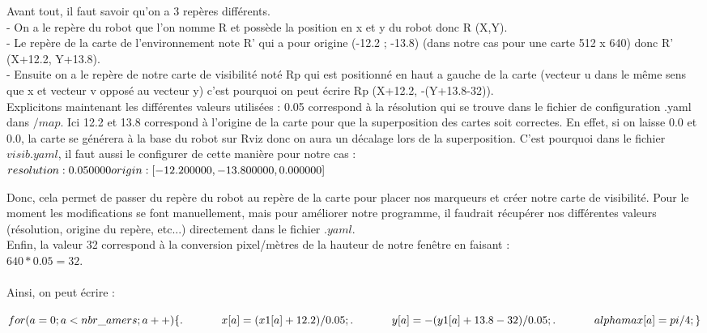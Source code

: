 \documentclass[10pt,a4paper]{article}
\begin{document}
Avant tout, il faut savoir qu'on a 3 repères différents.\\ 
- On a le repère du robot que l'on nomme R et possède la position en x et y du robot donc R (X,Y).\\
- Le repère de la carte de l'environnement note R' qui a pour origine (-12.2 ; -13.8) (dans notre cas pour une carte 512 x 640) donc R' (X+12.2, Y+13.8).\\ 
- Ensuite on a le repère de notre carte de visibilité noté Rp qui est positionné en haut a gauche de la carte (vecteur u dans le même sens que x et vecteur v opposé au vecteur y) c'est pourquoi on peut écrire Rp (X+12.2, -(Y+13.8-32)).\\

Explicitons maintenant les différentes valeurs utilisées : 0.05 correspond à la résolution qui se trouve dans le fichier de configuration .yaml dans $/map$. Ici 12.2 et 13.8 correspond à l'origine de la carte pour que la superposition des cartes soit correctes. En effet, si on laisse 0.0 et 0.0, la carte se générera à la base du robot sur Rviz donc on aura un décalage lors de la superposition. C'est pourquoi dans le fichier $visib.yaml$, il faut aussi le configurer de cette manière pour notre cas :\\
$resolution: 0.050000\\
origin: [-12.200000, -13.800000, 0.000000]\\
$

Donc, cela permet de passer du repère du robot au repère de la carte pour placer nos marqueurs et créer notre carte de visibilité. Pour le moment les modifications se font manuellement, mais pour améliorer notre programme, il faudrait récupérer nos différentes valeurs (résolution, origine du repère, etc...) directement dans le fichier $.yaml$.\\

Enfin, la valeur 32 correspond à la conversion pixel/mètres de la hauteur de notre fenêtre en faisant :\\ $640*0.05=32$.\\
\\
Ainsi, on peut écrire :

$\\
for(a=0;a<nbr\_amers;a++) ~\\
	\{  ~\\
. \hspace{35pt}    x[a]=(x1[a]+12.2)/0.05; ~\\
. \hspace{35pt}    y[a]=-(y1[a]+13.8-32)/0.05; ~\\
. \hspace{35pt}    alphamax[a]=pi/4; ~\\
	\} ~\\
	$
\end{document}
